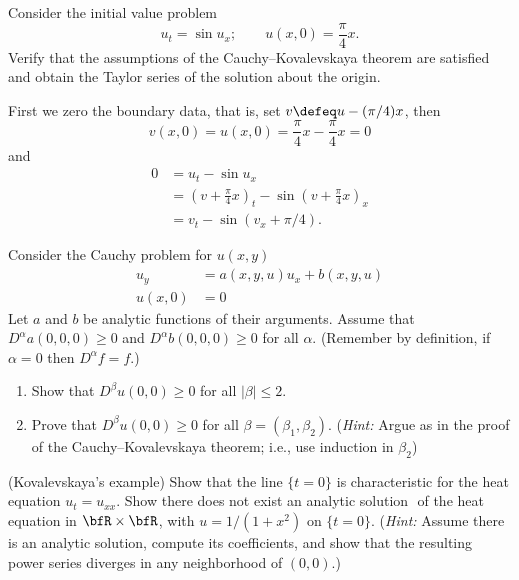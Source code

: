 \begin{problem}
  Consider the initial value problem
  \[
    u_t=\sin u_x;\qquad u(x,0)=\frac{\pi}{4}x.
  \]
  Verify that the assumptions of the Cauchy--Kovalevskaya theorem are
  satisfied and obtain the Taylor series of the solution about the origin.
\end{problem}
\begin{solution}
  First we zero the boundary data, that is, set \(v\defeq u-(\pi/4)x\), then
  \[
    v(x,0)=u(x,0)=\frac{\pi}{4}x-\frac{\pi}{4}x=0
  \]
  and
  \begin{align*}
    0
    &=u_t-\sin u_x\\
    &=\left(v+\frac{\pi}{4}x\right)_t
      -\sin\left(v+\frac{\pi}{4}x\right)_x\\
    &=v_t-\sin(v_x+\pi/4).
  \end{align*}
\end{solution}
\newpage

\begin{problem}
  Consider the Cauchy problem for \(u(x,y)\)
  \begin{align*}
    u_y&=a(x, y, u)u_x+b(x,y,u)\\
    u(x,0)&=0
  \end{align*}
  Let \(a\) and \(b\) be analytic functions of their arguments. Assume that
  \(D^\alpha a(0,0,0)\geq 0\) and \(D^\alpha b(0,0,0)\geq 0\) for all
  \(\alpha\). (Remember by definition, if \(\alpha=0\) then
  \(D^\alpha f=f\).)
  \begin{enumerate}[label=(\alph*),noitemsep]
  \item Show that \(D^\beta u(0,0)\geq 0\) for all \(|\beta|\leq 2\).
  \item Prove that \(D^\beta u(0,0)\geq 0\) for all
    \(\beta=(\beta_1,\beta_2)\). (\emph{Hint:} Argue as in the proof of the
    Cauchy--Kovalevskaya theorem; i.e., use induction in \(\beta_2\))
  \end{enumerate}
\end{problem}
\begin{solution}
\end{solution}
\newpage

\begin{problem}
  (Kovalevskaya's example) Show that the line \(\{t=0\}\) is characteristic
  for the heat equation \(u_t=u_{xx}\). Show there does not exist an
  analytic solution \(\) of the heat equation in \(\bfR\times\bfR\), with
  \(u=1/(1+x^2)\) on \(\{t=0\}\). (\emph{Hint:} Assume there is an analytic
  solution, compute its coefficients, and show that the resulting power
  series diverges in any neighborhood of \((0,0)\).)
\end{problem}
\begin{solution}
\end{solution}

